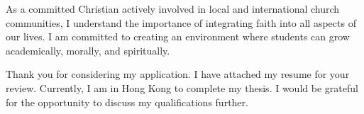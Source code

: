 \documentclass[11pt, a4paper]{awesome-cv}
\begin{document}
\begin{cvletter}
As a committed Christian actively involved in local and international church communities, I understand the importance of integrating faith into all aspects of our lives. I am committed to creating an environment where students can grow academically, morally, and spiritually.

Thank you for considering my application. I have attached my resume for your review. Currently, I am in Hong Kong to complete my thesis. I would be grateful for the opportunity to discuss my qualifications further.

\end{cvletter}


\makeletterclosing
\end{document}
